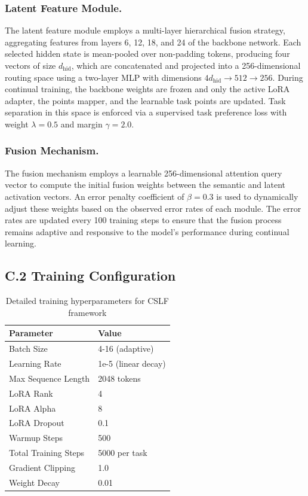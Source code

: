 \documentclass[11pt]{article}
\begin{document}
\subsubsection*{Latent Feature Module.}
The latent feature module employs a multi-layer hierarchical fusion strategy, aggregating features from layers 6, 12, 18, and 24 of the backbone network. Each selected hidden state is mean-pooled over non-padding tokens, producing four vectors of size $d_{\text{hid}}$, which are concatenated and projected into a 256-dimensional routing space using a two-layer MLP with dimensions $4d_{\text{hid}} \rightarrow 512 \rightarrow 256$. During continual training, the backbone weights are frozen and only the active LoRA adapter, the points mapper, and the learnable task points are updated. Task separation in this space is enforced via a supervised task preference loss with weight $\lambda = 0.5$ and margin $\gamma = 2.0$.

\subsubsection*{Fusion Mechanism.}
The fusion mechanism employs a learnable 256-dimensional attention query vector to compute the initial fusion weights between the semantic and latent activation vectors. An error penalty coefficient of $\beta = 0.3$ is used to dynamically adjust these weights based on the observed error rates of each module. The error rates are updated every 100 training steps to ensure that the fusion process remains adaptive and responsive to the model's performance during continual learning.

\subsection*{C.2 Training Configuration}

\begin{table}[t]
\centering
\begin{tabular}{ll}
\toprule
Parameter & Value \\
\midrule
Batch Size & 4-16 (adaptive) \\
Learning Rate & 1e-5 (linear decay) \\
Max Sequence Length & 2048 tokens \\
LoRA Rank & 4 \\
LoRA Alpha & 8 \\
LoRA Dropout & 0.1 \\
Warmup Steps & 500 \\
Total Training Steps & 5000 per task \\
Gradient Clipping & 1.0 \\
Weight Decay & 0.01 \\
\bottomrule
\end{tabular}
\caption{Detailed training hyperparameters for CSLF framework}
\label{tab:training-hyperparams}
\end{table}
\end{document}
